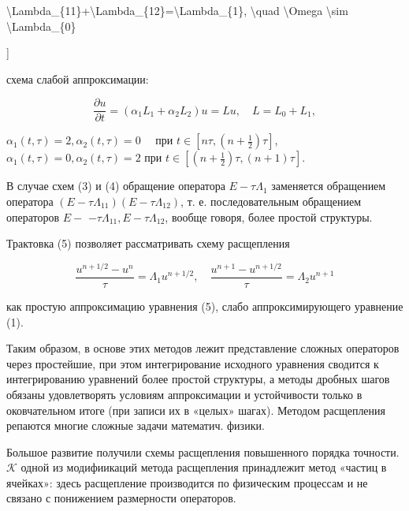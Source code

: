 \documentclass[10pt]{article}
\begin{document}
\textbackslash Lambda\_\{11\}+\textbackslash Lambda\_\{12\}=\textbackslash Lambda\_\{1\}, \textbackslash quad \textbackslash Omega \textbackslash sim \textbackslash Lambda\_\{0\}

]



схема слабой аппроксимации:



\[

\frac{\partial u}{\partial t}=\left(\alpha_{1} L_{1}+\alpha_{2} L_{2}\right) u=L u, \quad L=L_{0}+L_{1},

\]



$\alpha_{1}(t, \tau)=2, \alpha_{2}(t, \tau)=0 \quad$ при $t \in\left[n \tau,\left(n+\frac{1}{2}\right) \tau\right]$, $\alpha_{1}(t, \tau)=0, \alpha_{2}(t, \tau)=2$ при $t \in\left[\left(n+\frac{1}{2}\right) \tau,(n+1) \tau\right]$.



В случае схем (3) и (4) обращение оператора $E-\tau \Lambda_{1}$ заменяется обращением оператора $\left(E-\tau \Lambda_{11}\right)\left(E-\tau \Lambda_{12}\right)$, т. е. последовательным обращением операторов $E-$ $-\tau \Lambda_{11}, E-\tau \Lambda_{12}$, вообще говоря, более простой структуры.



Трактовка (5) позволяет рассматривать схему расщепления



\[

\frac{u^{n+1 / 2}-u^{n}}{\tau}=\Lambda_{1} u^{n+1 / 2}, \quad \frac{u^{n+1}-u^{n+1 / 2}}{\tau}=\Lambda_{2} u^{n+1}

\]



как простую аппроксимацию уравнения (5), слабо аппроксимирующего уравнение (1).



Таким образом, в основе этих методов лежит представление сложных операторов через простейшие, при этом интегрирование исходного уравнения сводится к интегрированию уравнений более простой структуры, а методы дробных шагов обязаны удовлетворять условиям аппроксимации и устойчивости только в оковчательном итоге (при записи их в «целых» шагах). Методом расщепления репаются многие сложные задачи математич. физики.



Большое развитие получили схемы расщепления повышенного порядка точности. $\mathcal{K}$ одной из модифиикаций метода расщепления принадлежит метод «частиц в ячейках»: здесь расщепление производится по физическим процессам и не связано с понижением размерности операторов.
\end{document}

